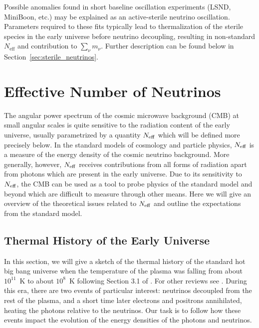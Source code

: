Possible anomalies found in short baseline oscillation experiments (LSND,
MiniBoon, etc.) may be explained as an active-sterile neutrino
oscillation.  Parameters required to these fits typically lead to
thermalization of the sterile species in the early universe before
neutrino decoupling, resulting in non-standard $N_\mathrm{eff}$ and
contribution to $\sum_\nu m_\nu$.  Further description can be found
below in Section~\ref{sec:sterile_neutrinos}.

\section{Effective Number of Neutrinos}


The angular power spectrum of the cosmic microwave background (CMB) at small angular scales is quite sensitive to the radiation content of the early universe, usually parametrized by a quantity $N_{\rm eff}$ which will be defined more precisely below.  In the standard models of cosmology and particle physics, $N_{\rm eff}$ is a measure of the energy density of the cosmic neutrino background.  More generally, however, $N_{\rm eff}$ receives contributions from all forms of radiation apart from photons which are present in the early universe.  Due to its sensitivity to $N_{\rm eff}$, the CMB can be used as a tool to probe physics of the standard model and beyond which are difficult to measure through other means.  Here we will give an overview of the theoretical issues related to $N_{\rm eff}$ and outline the expectations from the standard model.

\subsection{Thermal History of the Early Universe} \label{ThermalHistory}
In this section, we will give a sketch of the thermal history of the standard hot big bang universe when the temperature of the plasma was falling from about $10^{11}$~K to about $10^8$~K following Section 3.1 of \cite{Weinberg:2008zzc}.  For other reviews see \cite{Dolgov:2002wy,Agashe:2014kda}.  During this era, there are two events of particular interest: neutrinos decoupled from the rest of the plasma, and a short time later electrons and positrons annihilated, heating the photons relative to the neutrinos.  Our task is to follow how these events impact the evolution of the energy densities of the photons and neutrinos.

